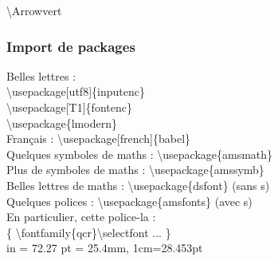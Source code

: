 \documentclass{report}
\begin{document}
{\selectfont \textbackslash{}Arrowvert}


\subsubsection*{Import de packages}

Belles lettres : \\
{\selectfont
\textbackslash{}usepackage[utf8]\{inputenc\} \\
\textbackslash{}usepackage[T1]\{fontenc\} \\
\textbackslash{}usepackage\{lmodern\}
} \\
Français : {\selectfont \textbackslash{}usepackage[french]\{babel\} } \\
Quelques symboles de maths : {\selectfont \textbackslash{}usepackage\{amsmath\} } \\
Plus de symboles de maths : {\selectfont \textbackslash{}usepackage\{amssymb\} } \\
Belles lettres de maths : {\selectfont \textbackslash{}usepackage\{dsfont\} } (sans s) \\
Quelques polices : {\selectfont \textbackslash{}usepackage\{amsfonts\} } (avec s)\\
{\selectfont En particulier, cette police-la : \\
\{ \textbackslash{}fontfamily\{qcr\}\textbackslash{}selectfont ... \} } \\
{ in = 72.27 pt = 25.4mm, 1cm=28.453pt }
	





\newpage
\end{document}
